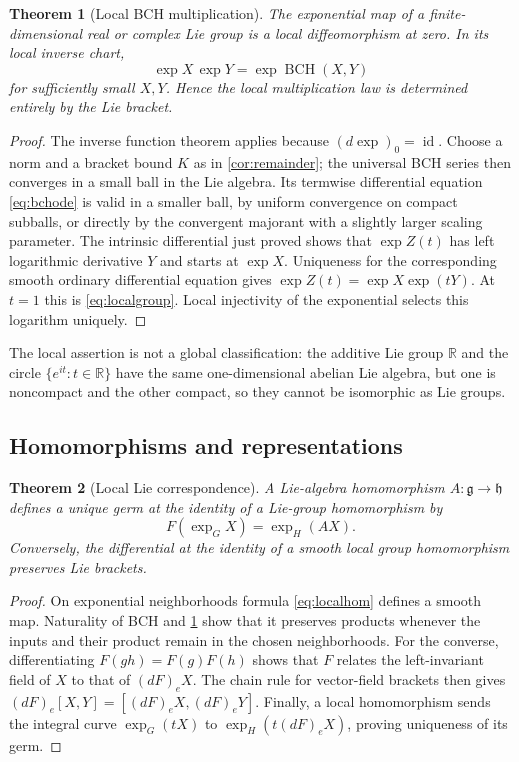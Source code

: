 \documentclass[11pt]{article}
\numberwithin{equation}{section}
\newtheorem{theorem}{Theorem}[section]
\theoremstyle{definition}
\theoremstyle{remark}
\DeclareMathOperator{\BCH}{BCH}
\DeclareMathOperator{\id}{id}
\newcommand{\R}{\mathbb{R}}
\newcommand{\g}{\mathfrak{g}}
\newcommand{\h}{\mathfrak{h}}
\begin{document}
\begin{theorem}[Local BCH multiplication]\label{thm:localgroup}
The exponential map of a finite-dimensional real or complex Lie
group is a local diffeomorphism at zero. In its local inverse chart,
\begin{equation}\label{eq:localgroup}
 \exp X\,\exp Y=\exp\BCH(X,Y)
\end{equation}
for sufficiently small $X,Y$. Hence the local multiplication law is
determined entirely by the Lie bracket.
\end{theorem}
\begin{proof}
The inverse function theorem applies because $(d\exp)_0=\id$.
Choose a norm and a bracket bound $K$ as in
\cref{cor:remainder}; the universal BCH series then converges in a
small ball in the Lie algebra. Its termwise differential equation
\eqref{eq:bchode} is valid in a smaller ball, by uniform convergence
on compact subballs, or directly by the convergent majorant with a
slightly larger scaling parameter. The intrinsic differential just
proved shows that $\exp Z(t)$ has left logarithmic derivative $Y$
and starts at $\exp X$. Uniqueness for the corresponding smooth
ordinary differential equation gives
$\exp Z(t)=\exp X\exp(tY)$. At $t=1$ this is
\eqref{eq:localgroup}. Local injectivity of the exponential selects
this logarithm uniquely.
\end{proof}
The local assertion is not a global classification: the additive
Lie group $\R$ and the circle $\{e^{it}:t\in\R\}$ have the same
one-dimensional abelian Lie algebra, but one is noncompact and the
other compact, so they cannot be isomorphic as Lie groups.

\subsection{Homomorphisms and representations}
\begin{theorem}[Local Lie correspondence]\label{thm:localcorrespondence}
A Lie-algebra homomorphism $A:\g\to\h$ defines a unique germ at the
identity of a Lie-group homomorphism by
\begin{equation}\label{eq:localhom}
 F(\exp_G X)=\exp_H(AX).
\end{equation}
Conversely, the differential at the identity of a smooth local
group homomorphism preserves Lie brackets.
\end{theorem}
\begin{proof}
On exponential neighborhoods formula \eqref{eq:localhom} defines a
smooth map. Naturality of BCH and \cref{thm:localgroup} show that it
preserves products whenever the inputs and their product remain in
the chosen neighborhoods. For the converse, differentiating
$F(gh)=F(g)F(h)$ shows that $F$ relates the left-invariant field of
$X$ to that of $(dF)_eX$. The chain rule for vector-field brackets
then gives $(dF)_e[X,Y]=[(dF)_eX,(dF)_eY]$. Finally, a local
homomorphism sends the integral curve $\exp_G(tX)$ to
$\exp_H(t(dF)_eX)$, proving uniqueness of its germ.
\end{proof}
\end{document}
